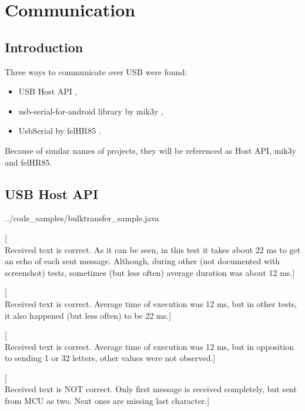\chapter{Communication}

\section{Introduction}
Three ways to communicate over USB were found:
\begin{itemize}
  \item USB Host API \cite{android_reference},
  \item usb-serial-for-android library by mik3y \cite{mik3y},
  \item UsbSerial by felHR85 \cite{felHR85}.
\end{itemize}
Because of similar names of projects, they will be referenced as Host API,
mik3y and felHR85.


\section{USB Host API}


{../code_samples/bulktransfer_sample.java}

[\\Received text is correct. As it can be seen, in this test it takes about 22
ms to get an echo of each sent message. Although, during other (not documented
with screenshot) tests, sometimes (but less often) average duration was about 12
ms.]

[\\Received text is correct. Average time of execution was 12 ms, but in other
tests, it also happened (but less often) to be 22 ms.]

[\\Received text is correct. Average time of execution was 12 ms, but in
opposition to sending 1 or 32 letters, other values were not observed.]

[\\Received text is NOT correct. Only first message is received completely, but
sent from MCU as two. Next ones are missing last character.]

